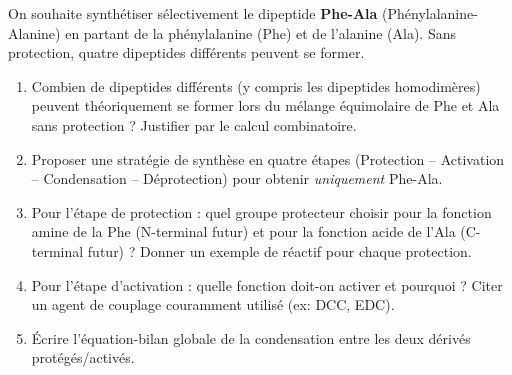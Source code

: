 \documentclass[11pt]{article}
\begin{document}
\begin{exercice}
On souhaite synthétiser sélectivement le dipeptide \textbf{Phe-Ala} (Phénylalanine-Alanine) en partant de la phénylalanine (Phe) et de l'alanine (Ala). Sans protection, quatre dipeptides différents peuvent se former.
\begin{enumerate}
    \item Combien de dipeptides différents (y compris les dipeptides homodimères) peuvent théoriquement se former lors du mélange équimolaire de Phe et Ala sans protection ? Justifier par le calcul combinatoire.
    \item Proposer une stratégie de synthèse en quatre étapes (Protection -- Activation -- Condensation -- Déprotection) pour obtenir \textit{uniquement} Phe-Ala.
    \item Pour l'étape de protection : quel groupe protecteur choisir pour la fonction amine de la Phe (N-terminal futur) et pour la fonction acide de l'Ala (C-terminal futur) ? Donner un exemple de réactif pour chaque protection.
    \item Pour l'étape d'activation : quelle fonction doit-on activer et pourquoi ? Citer un agent de couplage couramment utilisé (ex: DCC, EDC).
    \item Écrire l'équation-bilan globale de la condensation entre les deux dérivés protégés/activés.
\end{enumerate}
\end{exercice}
\end{document}
